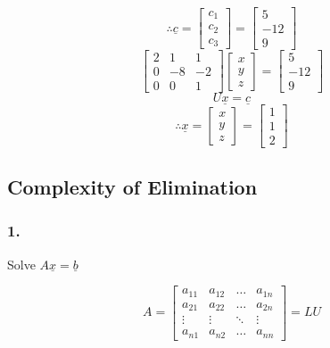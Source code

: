 \documentclass[12pt,a4paper]{article}
\begin{document}
\[
\therefore
\underline{c} = 
\begin{bmatrix}
  c_1 \\
  c_2 \\
  c_3
\end{bmatrix} = 
\begin{bmatrix}
  5 \\
  -12 \\
  9
\end{bmatrix}
\]
\[
  \begin{bmatrix}
    2 & 1 & 1 \\
    0 & -8 & -2 \\
    0 & 0 & 1
  \end{bmatrix}
  \begin{bmatrix}
    x \\
    y \\
    z
  \end{bmatrix} =
  \begin{bmatrix}
    5 \\
    -12 \\
    9
  \end{bmatrix}
\]
$$U\underline{x} = \underline{c}$$
\[
  \therefore
  \underline{x} = 
  \begin{bmatrix}
    x \\
    y \\
    z
  \end{bmatrix} = 
  \begin{bmatrix}
    1 \\
    1 \\
    2
  \end{bmatrix}
\]

\subsection*{Complexity of Elimination}
\subsubsection*{1.}
Solve $A\underline{x} = \underline{b}$

\[
  A = 
  \begin{bmatrix}
    a_{11} & a_{12} & \hdots & a_{1n} \\
    a_{21} & a_{22} & \hdots & a_{2n} \\
    \vdots & \vdots & \ddots & \vdots \\
    a_{n1} & a_{n2} & \hdots & a_{nn}
  \end{bmatrix} = 
  LU
\]
\end{document}
